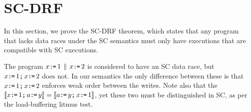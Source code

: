 \section{SC-DRF}

In this section, we prove the SC-DRF theorem, which states that any program
that lacks data races under the SC semantics must only have executions that
are compatible with SC executions.

The program $x\GETS1\PAR x\GETS2$ is considered to have an SC data race, but
$x\GETS1\SEMI x\GETS2$ does not.  In our semantics the only difference
between these is that $x\GETS1\SEMI x\GETS2$ enforces weak order between the
writes.  Note also that the
$\sem{x\GETS1\SEMI a\GETS y}=\sem{a\GETS y\SEMI x\GETS1}$, yet these two must
be distinguished in SC, as per the load-buffering litmus test.

